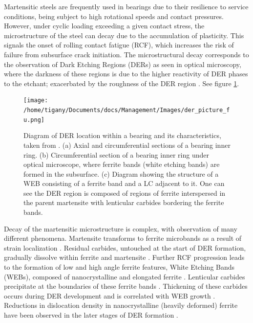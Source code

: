 \documentclass[a4paper,12pt,oneside,print,numbered,index,PageStyleIII]{PhDThesisPSnPDF}
\begin{document}
Martensitic steels are frequently used in bearings due to their resilience to service conditions,
being subject to high rotational speeds and contact pressures. However, under cyclic loading
exceeding a given contact stress, the microstructure of the steel can decay due to the accumulation
of plasticity. This signals the onset of rolling contact fatigue (RCF), which increases the risk of
failure from subsurface crack initiation. The microstructural decay corresponds to the observation
of Dark Etching Regions (DERs) as seen in optical microscopy, where the darkness of these regions is due
to the higher reactivity of DER phases to the etchant; exacerbated by
the roughness of the DER region \cite{skf2019}. See figure \ref{fuderpicture}.

\begin{figure}[htbp]
\centering
\texttt{[image: /home/tigany/Documents/docs/Management/Images/der\_picture\_fu.png]}
\caption{Diagram of DER location within a bearing and its characteristics, taken from \cite{Fu2017}. (a) Axial and circumferential sections of a bearing inner ring. (b) Circumferential section of a bearing inner ring under optical microscope, where ferrite bands (white etching bands) are formed in the subsurface. (c) Diagram showing the structure of a WEB consisting of a ferrite band and a LC adjacent to it. One can see the DER region is composed of regions of ferrite interspersed in the parent martensite with lenticular carbides bordering the ferrite bands. \label{fuderpicture}}
\end{figure}


Decay of the martensitic microstructure is complex, with observation of many different
phenomena. Martensite transforms to ferrite microbands as a result of strain localization
\cite{Fu2017,il_micros_alter_rollin_contac_fatig,jonesil_metal_obser_ball_bearin_fatig_phenom,70_micros_microh_resid_stres_chang,Swahn1976,Voskamp1997,voskamp97_state_resid_stres_induc_by,polonsky95_white_etchin_band_format_rollin_bearin,vsmelova17_elect_micros_inves_micros_alter}. Residual
carbides, untouched at the start of DER formation, gradually dissolve within ferrite and
martensite \cite{70_micros_microh_resid_stres_chang,Swahn1976,Osterlund_1980}. Further RCF
progression leads to the formation of low and high angle ferrite features, White Etching Bands
(WEBs), composed of nanocrystalline \cite{Voskamp1997,Osterlund_1980,Mitamura_2007} and elongated
ferrite \cite{vsmelova17_elect_micros_inves_micros_alter}. Lenticular carbides precipitate at the
boundaries of these ferrite bands \cite{Swahn1976,Osterlund_1980}. Thickening of these carbides
occurs during DER development and is correlated with WEB growth
\cite{Fu2017,fu17_strain_induc_marten_decay_bearin,Warhadpande1_2013,Warhadpande2013}. Reductions in
dislocation density in nanocrystalline (heavily deformed) ferrite have been observed in the later
stages of DER formation \cite{skf2019,voskamp80_gradual_chang_resid_stres_micros}.
\end{document}
